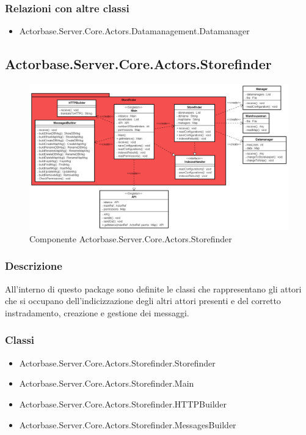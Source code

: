 \documentclass[a4paper]{article}
\begin{document}
			\subsubsection{Relazioni con altre classi}
			\begin{itemize}
				\item Actorbase.Server.Core.Actors.Datamanagement.Datamanager
			\end{itemize}
			
		\subsection{Actorbase.Server.Core.Actors.Storefinder}
			\begin{figure} [H]
			\centering
			\includegraphics[width=\textwidth]{Server/Package/StorefinderLevel.png}
			\caption{Componente Actorbase.Server.Core.Actors.Storefinder}
			\end{figure}
			\subsubsection{Descrizione}
				All'interno di questo package sono definite le classi che rappresentano gli attori che si occupano dell'indicizzazione degli altri attori presenti e del corretto instradamento, creazione e gestione dei messaggi.
			\subsubsection{Classi}
			\begin{itemize}
				\item Actorbase.Server.Core.Actors.Storefinder.Storefinder
				\item Actorbase.Server.Core.Actors.Storefinder.Main
				\item Actorbase.Server.Core.Actors.Storefinder.HTTPBuilder
				\item Actorbase.Server.Core.Actors.Storefinder.MessagesBuilder
			\end{itemize}
\end{document}
